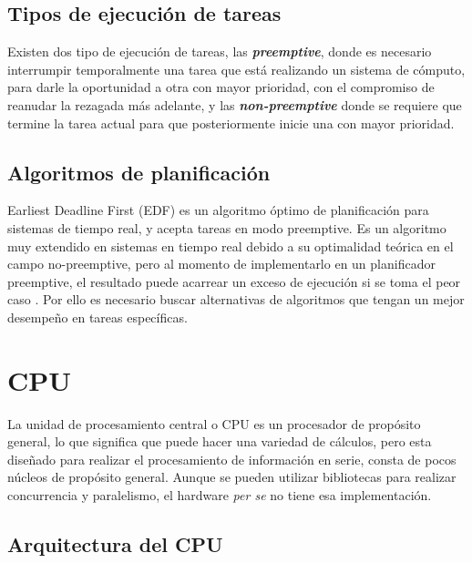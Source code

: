     \subsection{Tipos de ejecución de tareas}

    Existen dos tipo de ejecución de tareas, las \textit{\textbf{preemptive}}, donde es necesario interrumpir temporalmente una tarea que está realizando un sistema de cómputo, para darle la oportunidad a otra con mayor prioridad, con el compromiso de reanudar la rezagada más adelante, y las \textit{\textbf{non-preemptive}} donde se requiere que termine la tarea actual para que posteriormente inicie una con mayor prioridad.

    \subsection{Algoritmos de planificación}

    Earliest Deadline First (EDF) es un algoritmo óptimo de planificación para sistemas de tiempo real, y acepta tareas en modo preemptive. Es un algoritmo muy extendido en sistemas en tiempo real debido a su optimalidad teórica en el campo no-preemptive, pero al momento de implementarlo en un planificador preemptive, el resultado puede acarrear un exceso de ejecución si se toma el peor caso \cite{EmbSysDes}. Por ello es necesario buscar alternativas de algoritmos que tengan un mejor desempeño en tareas específicas.


    \section{CPU}
    La unidad de procesamiento central o CPU es un procesador de propósito general, lo que significa que puede hacer una variedad de cálculos, pero esta diseñado para realizar el procesamiento de información en serie, consta de pocos núcleos de propósito general. Aunque se pueden utilizar bibliotecas para realizar concurrencia y paralelismo, el hardware \textit{per se} no tiene esa implementación.

     \subsection{Arquitectura del CPU}

